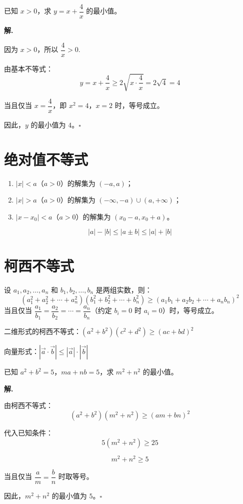 \begin{example}
已知 $x > 0$，求 $y = x + \dfrac{4}{x}$ 的最小值。
\end{example}

\textbf{解.}

因为 $x > 0$，所以 $\dfrac{4}{x} > 0$.

由基本不等式：
\[ y = x + \frac{4}{x} \geq 2\sqrt{x \cdot \frac{4}{x}} = 2\sqrt{4} = 4 \]

当且仅当 $x = \dfrac{4}{x}$，即 $x^2 = 4$，$x = 2$ 时，等号成立。

因此，$y$ 的最小值为 $4$。\hfill $\square$

\section{绝对值不等式}

\begin{theorem}[绝对值不等式的解法]
\begin{enumerate}
    \item $|x| < a$（$a > 0$）的解集为 $(-a, a)$；
    \item $|x| > a$（$a > 0$）的解集为 $(-\infty, -a) \cup (a, +\infty)$；
    \item $|x - x_0| < a$（$a > 0$）的解集为 $(x_0 - a, x_0 + a)$。
\end{enumerate}
\end{theorem}

\begin{theorem}[绝对值三角不等式]
\[ |a| - |b| \leq |a \pm b| \leq |a| + |b| \]
\end{theorem}

\section{柯西不等式}

\begin{theorem}[柯西不等式]
设 $a_1, a_2, \ldots, a_n$ 和 $b_1, b_2, \ldots, b_n$ 是两组实数，则：
\[ (a_1^2 + a_2^2 + \cdots + a_n^2)(b_1^2 + b_2^2 + \cdots + b_n^2) \geq (a_1b_1 + a_2b_2 + \cdots + a_nb_n)^2 \]
当且仅当 $\dfrac{a_1}{b_1} = \dfrac{a_2}{b_2} = \cdots = \dfrac{a_n}{b_n}$（约定 $b_i = 0$ 时 $a_i = 0$）时，等号成立。
\end{theorem}

\begin{note}
二维形式的柯西不等式：$(a^2 + b^2)(c^2 + d^2) \geq (ac + bd)^2$

向量形式：$|\vec{a} \cdot \vec{b}| \leq |\vec{a}| \cdot |\vec{b}|$
\end{note}

\begin{example}
已知 $a^2 + b^2 = 5$，$ma + nb = 5$，求 $m^2 + n^2$ 的最小值。
\end{example}

\textbf{解.}

由柯西不等式：
\[ (a^2 + b^2)(m^2 + n^2) \geq (am + bn)^2 \]

代入已知条件：
\[ 5(m^2 + n^2) \geq 25 \]

\[ m^2 + n^2 \geq 5 \]

当且仅当 $\dfrac{a}{m} = \dfrac{b}{n}$ 时取等号。

因此，$m^2 + n^2$ 的最小值为 $5$。\hfill $\square$
